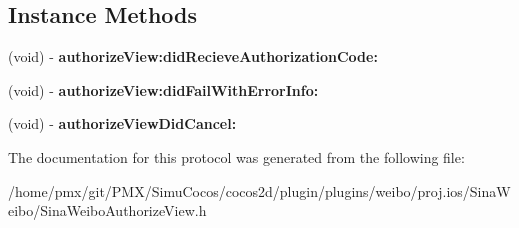 \subsection*{Instance Methods}
\begin{DoxyCompactItemize}
\item 
\mbox{\label{protocolSinaWeiboAuthorizeViewDelegate_01-p_ace29cc7514c7943483b02f5c6683817b}} 
(void) -\/ {\bfseries authorize\+View\+:did\+Recieve\+Authorization\+Code\+:}
\item 
\mbox{\label{protocolSinaWeiboAuthorizeViewDelegate_01-p_a6c66fdebe4fa6b194dff9eb674351b24}} 
(void) -\/ {\bfseries authorize\+View\+:did\+Fail\+With\+Error\+Info\+:}
\item 
\mbox{\label{protocolSinaWeiboAuthorizeViewDelegate_01-p_ac4827a790559512e8c326961100decb8}} 
(void) -\/ {\bfseries authorize\+View\+Did\+Cancel\+:}
\end{DoxyCompactItemize}


The documentation for this protocol was generated from the following file\+:\begin{DoxyCompactItemize}
\item 
/home/pmx/git/\+P\+M\+X/\+Simu\+Cocos/cocos2d/plugin/plugins/weibo/proj.\+ios/\+Sina\+Weibo/Sina\+Weibo\+Authorize\+View.\+h\end{DoxyCompactItemize}

